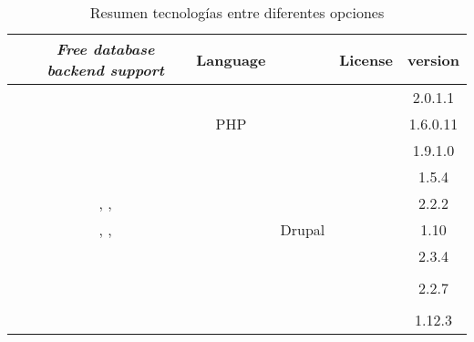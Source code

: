 \begin{table}[H]
    \tiny
   
\begin{tabular}{ |l|c|c|c|c|c| }

\hline
	&
	\textit{Free database backend support}&
	Language&
	\textit{\gloss{waf}}&
	License&
	version

\\ \hline
	\nameOpenCart &
	\mysql&
	\php&
	&
	\gplthreelicense &
	2.0.1.1
	
\\ \hline
	\namePrestaShop &
	\mysql&
	PHP&
	&
	\opslicense &
	1.6.0.11
	
\\ \hline
	\nameMagento &
	\mysql&
	\php&
	\nameZendFramework \cite{online_zend_framework}&
	\opslicense &
	1.9.1.0
	
\\ \hline
	\nameZenCart &
	\mysql&
	\php&
	&
	\gpllicense &
	1.5.4
 
\\ \hline
	\nameSpreeCommerce &
	\mysql, \postgresql, \sqlitethree&
	\ruby \cite{online_ruby_language}&
	\rubyonrails \cite{online_ruby_rails}&
	\bsdthreelicense&
	2.2.2

\\ \hline
	\nameDrupalCommerce &
	\mysql, \postgresql, \sqlitethree&
	\php&
	Drupal\cite{online_drupal}&
	\gpllicense &
	1.10
	
\\ \hline
	\nameOsCommerce &
	\mysql&
	\php&
	&
	\gpllicense &
	2.3.4

\\ \hline
	\nameSimpleCart &
	&
	&
	&
	&
	
\\ \hline
	\nameWooCommerce &
	\mysql&
	\php&
	\wordPress \cite{online_wordpress}&
	\gpllicense &
	2.2.7
	
\\ \hline
	\nameWPECommerce &
	&
	&
	&
	&
	
\\ \hline
	\nameJigoshop &
	\mysql&
	\php&
	\wordPress \cite{online_wordpress}&
	\gpllicense &
	1.12.3
	
\\ \hline
\end{tabular}
    \caption{ Resumen tecnologías entre diferentes opciones \ecommerce}
    \label{tab:resume_technology_ecommerce}
\end{table}





